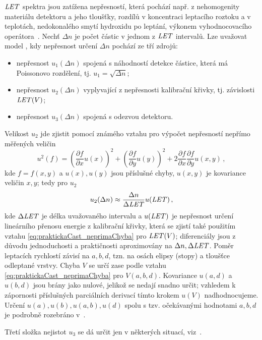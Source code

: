 $\mathit{LET}$ spektra jsou zatížena nepřesností, která pochází např. z nehomogenity materiálu detektoru a jeho tloušťky, rozdílů v koncentraci leptacího roztoku a v teplotách, nedokonalého smytí hydroxidu po leptání, výkonem vyhodnocovacího operátora~\cite{nejistoty}. Nechť $\Delta n$ je počet částic v jednom z $\mathit{LET}$ intervalů. Lze uvažovat model \cite{nejistoty}, kdy nepřesnost určení $\Delta n$ pochází ze tří zdrojů:
\begin{itemize}
  \item nepřesnost $u_1(\Delta n)$ spojená s náhodností detekce částice, která má Poissonovo rozdělení, tj. $u_1=\sqrt{\Delta n}$;
  \item nepřesnost $u_2(\Delta n)$ vyplyvající z nepřesnosti kalibrační křivky, tj. závislosti $\mathit{LET}(V)$;
  \item nepřesnost $u_3(\Delta n)$ spojená s odezvou detektoru.
\end{itemize}
Velikost $u_2$ jde zjistit pomocí známého vztahu pro výpočet nepřesností nepřímo měřených veličin
\begin{equation}
  u^2(f)=\left(\frac{\partial f}{\partial x}u(x)\right)^2+\left( \frac{\partial f}{\partial y}u(y) \right)^2+2\frac{\partial f}{\partial x}\frac{\partial f}{\partial y}u(x,y)\,,
  \label{eq:praktickaCast_neprimaChyba}
\end{equation}
kde $f=f(x,y)$ a $u(x), u(y)$ jsou příslušné chyby, $u(x,y)$ je kovariance veličin $x,y$; tedy pro $u_2$
\begin{equation}
  u_2(\Delta n)\approx\frac{\Delta n}{\Delta\mathit{LET}}u(\mathit{LET})\,,
  \label{eq:praktickaCast_u2}
\end{equation}
kde $\Delta\mathit{LET}$ je délka uvažovaného intervalu a $u(\mathit{LET})$ je nepřesnost určení lineárního přenosu energie z kalibrační křivky, která se zjistí také použitím vztahu \eqref{eq:praktickaCast_neprimaChyba} pro $\mathit{LET}(V)$; diferenciály jsou z důvodu jednoduchosti a praktičnosti aproximovány na $\Delta n, \Delta\mathit{LET}$. Poměr leptacích rychlostí závisí na $a,b,d$, tzn. na osách elipsy (stopy) a tloušťce odleptané vrstvy. Chyba $V$ se určí zase podle vztahu \eqref{eq:praktickaCast_neprimaChyba} pro $V(a,b,d)$. Kovariance $u(a,d)$ a $u(b,d)$ jsou brány jako nulové, jelikož se nedají snadno určit; vzhledem k zápornosti příslušných parciálních derivací tímto krokem $u(V)$ nadhodnocujeme. Určení $u(a), u(b), u(a,b), u(d)$ spolu s tzv. očekávanými hodnotami $a,b,d$ je podrobně
rozebráno v~\cite{nejistoty}.

Třetí složka nejistot $u_3$ se dá určit jen v některých situací, viz~\cite{nejistoty}.

